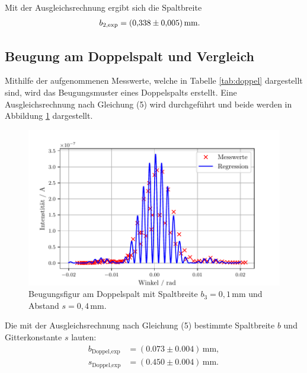 \noindent Mit der Ausgleichsrechnung ergibt sich die Spaltbreite
\begin{align*}
b_\text{2,exp} &= (\num{0.338 +- 0.005}) \,\si{\milli\meter}.
\end{align*}

\subsection{Beugung am Doppelspalt und Vergleich}
Mithilfe der aufgenommenen Messwerte, welche in Tabelle \ref{tab:doppel} dargestellt sind,
wird das Beugungsmuster eines Doppelspalts erstellt. Eine Ausgleichsrechnung nach Gleichung (5)
wird durchgeführt und beide werden in Abbildung \ref{fig:doppel} dargestellt.

\begin{figure}[H]
  \center
  \includegraphics[scale = 0.75]{doppelfix.pdf}
  \caption{Beugungsfigur am Doppelspalt mit Spaltbreite $b_3 = 0,1\,\si{\milli\meter}$ und Abstand $s = 0,4\,\si{\milli\meter}$.}
  \label{fig:doppel}
\end{figure}

Die mit der Ausgleichsrechnung nach Gleichung (5) bestimmte Spaltbreite $b$ und Gitterkonstante $s$ lauten:
\begin{align*}
b_\text{Doppel,exp} &= (0.073 \pm 0.004)\,\si{\milli\meter},\\
s_\text{Doppel,exp} &= (0.450 \pm 0.004)\,\si{\milli\meter}.
\end{align*}

